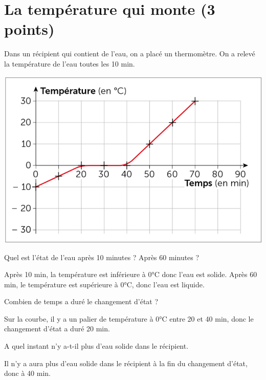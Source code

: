 \section{La température qui monte (3 points)}\label{ex:fusion}

Dans un récipient qui contient de l'eau, on a placé un thermomètre. On a relevé la température de l'eau toutes les 10 min.

\begin{center}
	\includegraphics[scale=0.4]{./img/courbe}
\end{center}

\begin{questions}
	\question[1] Quel est l'état de l'eau après 10 minutes ? Après 60 minutes ?
	\begin{solution}
		Après 10 min, la température est inférieure à 0°C donc l'eau est solide. Après 60 min, le température est supérieure à 0°C, donc l'eau est liquide.
	\end{solution}
	
	\question[1] Combien de temps a duré le changement d'état ?
	\begin{solution}
		Sur la courbe, il y a un palier de température à 0°C entre 20 et 40 min, donc le changement d'état a duré 20 min.
	\end{solution}
	
	\question[1] A quel instant n'y a-t-il plus d'eau solide dans le récipient. 
	\begin{solution}
		Il n'y a aura plus d'eau solide dans le récipient à la fin du changement d'état, donc à 40 min.
	\end{solution}
\end{questions}